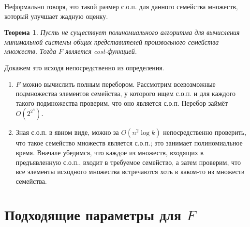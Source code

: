\documentclass{article}
\newtheorem*{theorem}{Теорема}
\begin{document}
    Неформально говоря, это такой размер с.о.п. для данного семейства множеств, который улучшает жадную оценку.


\begin{theorem}
    Пусть не существует полиномиального алгоритма для вычисления минимальной системы общих представителей произвольного семейства множеств. Тогда $F$ является cost-функцией. 
\end{theorem}

Докажем это исходя непосредственно из определения.
\begin{enumerate}
\item $F$ можно вычислить полным перебором. Рассмотрим всевозможные подмножества элементов семейства, у которого ищем с.о.п. и для каждого такого подмножества проверим, что оно является с.о.п. Перебор займёт $O(2^{2^n})$. 
\item Зная с.о.п. в явном виде, можно за $O(n^2 \log k)$ непосредственно проверить, что такое семейство множеств является с.о.п.; это занимает полиномиальное время. Вначале убедимся, что каждое из множеств, входящих в предъявленную с.о.п., входит в требуемое семейство, а затем проверим, что все элементы исходного множества встречаются хоть в каком-то из множеств семейства.
\end{enumerate}

\section{Подходящие параметры для $F$}
\end{document}
